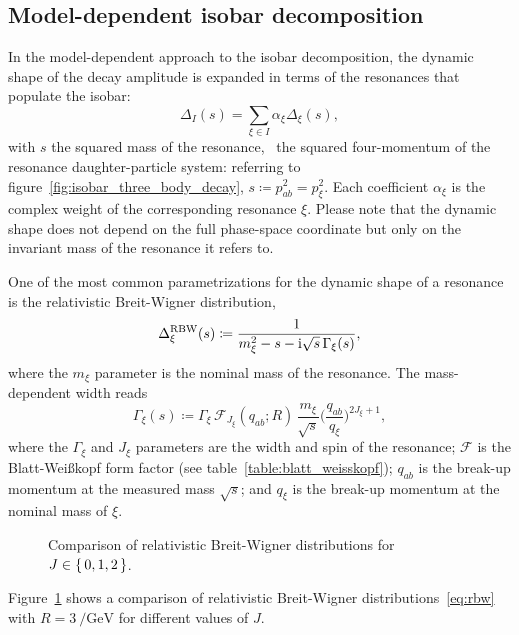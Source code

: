 \subsection{Model-dependent isobar decomposition}


    In the model-dependent approach to the isobar decomposition, the dynamic shape of the decay amplitude is expanded in terms of the resonances that populate the isobar:
    \begin{equation}\label{eq:isobar_mass_shape_expansion}
        \Delta_I(s) = \sum_{\xi\in I} \alpha_{\xi}\Delta_{\xi}(s),
    \end{equation}
    with $s$ the squared mass of the resonance, \ie~the squared four-momentum of the resonance daughter-particle system: referring to figure~\ref{fig:isobar_three_body_decay}, $s\coloneqq p_{ab}^2 = p_{\xi}^2$.
    Each coefficient $\alpha_{\xi}$ is the complex weight of the corresponding resonance $\xi$.
    Please note that the dynamic shape does not depend on the full phase-space coordinate but only on the invariant mass of the resonance it refers to.


    One of the most common parametrizations for the dynamic shape of a resonance is the relativistic Breit-Wigner distribution,
    \begin{equation}\label{eq:rbw}
        \Delta_{\xi}^{\text{RBW}}(s) \coloneqq \frac{1}{m_{\xi}^2 - s - \mathrm{i} \sqrt{s}\, \Gamma_\xi(s)},
    \end{equation}
    where the $m_{\xi}$ parameter is the nominal mass of the resonance.
    The mass-dependent width reads
    \begin{equation}
        \Gamma_\xi(s) \coloneqq \Gamma_{\xi} \, \mathcal{F}_{\!J_\xi}\!(q_{ab};R)\, \frac{m_{\xi}}{\sqrt{s}} \bigg(\frac{q_{ab}}{q_{\xi}}\bigg)^{2J_{\xi}+1},
    \end{equation}
    where the $\Gamma_{\xi}$ and $J_{\xi}$ parameters are the width and spin of the resonance;
    $\mathcal{F}$ is the Blatt-Wei\ss{}kopf form factor (see table~\ref{table:blatt_weisskopf});
    $q_{ab}$ is the break-up momentum at the measured mass $\sqrt{s}$;
    and $q_\xi$ is the break-up momentum at the nominal mass of $\xi$.
    \begin{figure}
        \centering
        
        \caption{Comparison of relativistic Breit-Wigner distributions for $J\in\set{0,1,2}$.}
        \label{fig:comparison_rbws}
    \end{figure}
    Figure~\ref{fig:comparison_rbws} shows a comparison of relativistic Breit-Wigner distributions~\eqref{eq:rbw} with $R = \SI{3}{\per\giga\electronvolt}$ for different values of $J$.


